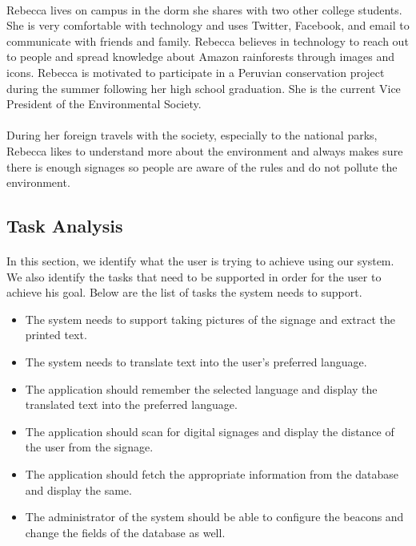 \documentclass[12pt]{article}
\begin{document}
\paragraph{} Rebecca lives on campus in the dorm she shares with two other college students. She is very comfortable with technology and uses Twitter, Facebook, and email to communicate with friends and family. Rebecca believes in technology to reach out to people and spread knowledge about
Amazon rainforests through images and icons. Rebecca is motivated to participate in a Peruvian conservation project during the summer following her high school graduation. She is the current Vice President of the Environmental Society.

\paragraph{} During her foreign travels with the society, especially to the national parks, Rebecca likes to understand more about the environment and always makes sure there is enough signages so people are aware of the rules and do not pollute the environment. 

\subsection{Task Analysis}
\label{task}
\paragraph{}In this section, we identify what the user is trying to achieve using our system. We also identify the tasks that need to be supported in order for the user to achieve his goal. Below are the list of tasks the system needs to support. 

\begin{itemize}

 \item The system needs to support taking pictures of the signage and extract the printed text. 
 
  \item The system needs to translate text into the user's preferred language.
 
  \item The application should remember the selected language and display the translated text into the preferred language.
  
  \item The application should scan for digital signages and display the distance of the user from the signage.
  
    \item The application should fetch the appropriate information from the database and display the same.
    
    \item The administrator of the system should be able to configure the beacons and change the fields of the database as well.
    
    \end{itemize}
    
\end{document}
